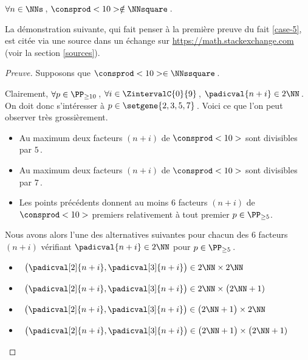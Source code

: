 \begin{fact} \label{case-10}
	 $\forall n \in \NNs$\,, $\consprod<10> \notin \NNsquare$\,.
\end{fact}




La démonstration suivante, qui fait penser à la première preuve du fait \ref{case-5}, est citée via une source dans un échange sur \url{https://math.stackexchange.com} (voir la section \ref{sources}).


\begin{proof}[Preuve]%
    Supposons que $\consprod<10> \in \NNssquare$\,.
    
    \smallskip
    
    Clairement, 
    $\forall p \in \PP_{\geq 10}$\,, 
    $\forall i \in \ZintervalC{0}{9}$\,, 
    $\padicval{n + i} \in 2 \NN$\,.
    On doit donc s'intéresser à $p \in \setgene{2, 3, 5, 7}$\,. Voici ce que l'on peut observer très grossièrement.
    \begin{itemize}
		\item Au maximum deux facteurs $(n + i)$ de $\consprod<10>$ sont divisibles par $5$\,.

		\item Au maximum deux facteurs $(n + i)$ de $\consprod<10>$ sont divisibles par $7$\,.

		\item Les points précédents donnent au moins $6$ facteurs $(n + i)$ de $\consprod<10>$ premiers relativement à tout premier $p \in \PP_{\geq 5}$.
    \end{itemize}
    
    Nous avons alors l'une des alternatives suivantes pour chacun des $6$ facteurs $(n+i)$ vérifiant $\padicval{n + i} \in 2 \NN$ pour $p \in \PP_{\geq 5}$\,.
    \begin{itemize}
    	\smallskip
		\item {}\,
		$\big( \padicval[2]{n + i} , \padicval[3]{n + i} \big) \in 2 \NN \times 2 \NN$

    	\smallskip
		\item {}\,
		$\big( \padicval[2]{n + i} , \padicval[3]{n + i} \big) \in 2 \NN \times \big( 2 \NN + 1)$

    	\smallskip
		\item {}\,
		$\big( \padicval[2]{n + i} , \padicval[3]{n + i} \big) \in \big( 2 \NN + 1 \big) \times 2 \NN$

    	\smallskip
		\item {}\,
		$\big( \padicval[2]{n + i} , \padicval[3]{n + i} \big) \in \big( 2 \NN + 1 \big) \times \big( 2 \NN + 1)$
    \end{itemize}
    

\end{proof}
